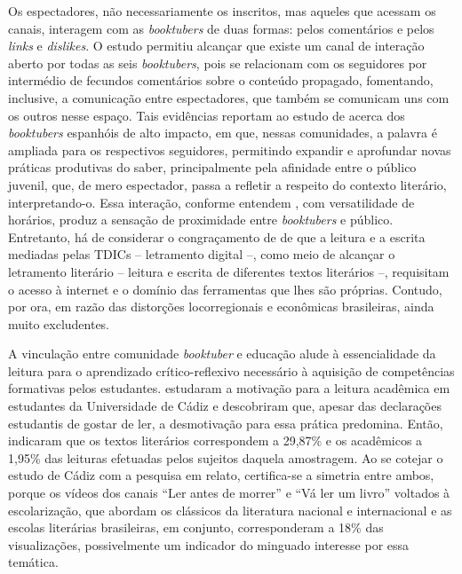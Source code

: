 \documentclass[portuguese]{textolivre}
\begin{document}
Os espectadores, não necessariamente os inscritos, mas aqueles que
acessam os canais, interagem com as \emph{booktubers} de duas formas:
pelos comentários e pelos \emph{links} e \emph{dislikes}. O
estudo permitiu alcançar que existe um canal de interação aberto por
todas as seis \emph{booktubers}, pois
se relacionam com os seguidores por
intermédio de fecundos comentários sobre o conteúdo propagado,
fomentando, inclusive, a comunicação entre espectadores, que também se
comunicam uns com os outros nesse espaço. Tais evidências reportam ao
estudo de \textcite{VizcanoVerd2019} %
acerca
dos \emph{booktubers} espanhóis de alto impacto, em que, nessas
comunidades, a palavra é ampliada para os respectivos seguidores,
permitindo expandir e aprofundar novas práticas produtivas do saber,
principalmente pela afinidade entre o público juvenil, que, de mero
espectador, passa a refletir a respeito do contexto literário,
interpretando-o. Essa interação, conforme entendem \textcite{oliveira2021booktubers}, %
com versatilidade de horários, produz a sensação de proximidade
entre \emph{booktubers} e público. Entretanto, há de considerar o
congraçamento de \textcite{Silva2021} %
de que a leitura e a escrita
mediadas pelas TDICs -- letramento digital --, como meio de alcançar o
letramento literário -- leitura e escrita de diferentes textos
literários --, requisitam o acesso à internet e o domínio das
ferramentas que lhes são próprias. Contudo, por ora, em razão das
distorções locorregionais e econômicas brasileiras, ainda muito
excludentes.

A vinculação entre comunidade \emph{booktuber} e educação alude à
essencialidade da leitura para o aprendizado crítico-reflexivo
necessário à aquisição de competências formativas pelos estudantes.
\textcite{SantosDaz2021}
estudaram a motivação
para a leitura acadêmica em estudantes da Universidade de Cádiz e
descobriram que, apesar das declarações estudantis de gostar de ler, a
desmotivação para essa prática predomina. Então, indicaram que os textos
literários correspondem a 29,87\% e os acadêmicos a 1,95\% das leituras
efetuadas pelos sujeitos daquela amostragem. Ao se cotejar o estudo de
Cádiz com a pesquisa em relato, certifica-se a simetria entre ambos,
porque os vídeos dos canais ``Ler antes de morrer'' \cite{lubrano2021} %
e ``Vá ler um livro'' \cite{leite2021} %
voltados à escolarização, que abordam
os clássicos da literatura nacional e internacional e as escolas
literárias brasileiras, em conjunto, corresponderam a 18\% das
visualizações, possivelmente um indicador do minguado interesse por essa
temática.
\end{document}

